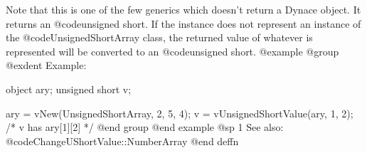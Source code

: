 Note that this is one of the few generics which doesn't return a Dynace
object.  It returns an @code{unsigned short}.  If the instance does not represent
an instance of the @code{UnsignedShortArray} class, the returned value of
whatever is represented will be converted to an @code{unsigned short}.
@example
@group
@exdent Example:

object  ary;
unsigned short   v;

ary = vNew(UnsignedShortArray, 2, 5, 4);
v = vUnsignedShortValue(ary, 1, 2);
/*  v has ary[1][2]  */
@end group
@end example
@sp 1
See also:  @code{ChangeUShortValue::NumberArray}
@end deffn




